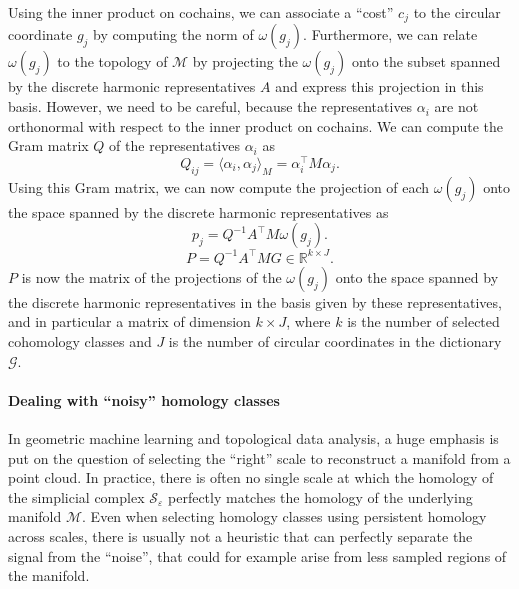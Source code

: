 \documentclass[a4paper,11pt, DIV=10]{scrartcl}
\numberwithin{equation}{section}
\theoremstyle{definition}
\theoremstyle{remark}
\newcommand{\R}{\mathbb{R}}
\newcommand{\mc}[1]{\mathcal{#1}}
\begin{document}
Using the inner product on cochains, we can associate a \enquote{cost} $c_j$ to the circular coordinate $g_j$ by computing the norm of $\omega (g_j)$.
Furthermore, we can relate $\omega (g_j)$ to the topology of $\mc{M}$ by projecting the $\omega (g_j)$ onto the subset spanned by the discrete harmonic representatives $A$ and express this projection in this basis.
However, we need to be careful, because the representatives $\alpha_i$ are not orthonormal with respect to the inner product on cochains.
We can compute the Gram matrix $Q$ of the representatives $\alpha_i$ as
\begin{equation}
Q_{ij} = \langle \alpha_i, \alpha_j \rangle_M = \alpha_i^\top M \alpha_j.
\end{equation}
Using this Gram matrix, we can now compute the projection of each $\omega(g_j)$ onto the space spanned by the discrete harmonic representatives as
\begin{equation}
p_j = Q^{-1}A^\top M \omega(g_j).
\end{equation}
\begin{equation}
P=Q^{-1} A^\top M G \in \R^{k\times J}.
\end{equation}
$P$ is now the matrix of the projections of the $\omega (g_j)$ onto the space spanned by the discrete harmonic representatives in the basis given by these representatives, and in particular a matrix of dimension $k\times J$, where $k$ is the number of selected cohomology classes and $J$ is the number of circular coordinates in the dictionary $\mathcal{G}$.

\paragraph{Dealing with \enquote{noisy} homology classes}
In geometric machine learning and topological data analysis, a huge emphasis is put on the question of selecting the \enquote{right} scale to reconstruct a manifold from a point cloud.
In practice, there is often no single scale at which the homology of the simplicial complex $\mc{S}_\varepsilon$ perfectly matches the homology of the underlying manifold $\mc{M}$.
Even when selecting homology classes using persistent homology across scales, there is usually not a heuristic that can perfectly separate the signal from the \enquote{noise}, that could for example arise from less sampled regions of the manifold.
\end{document}
